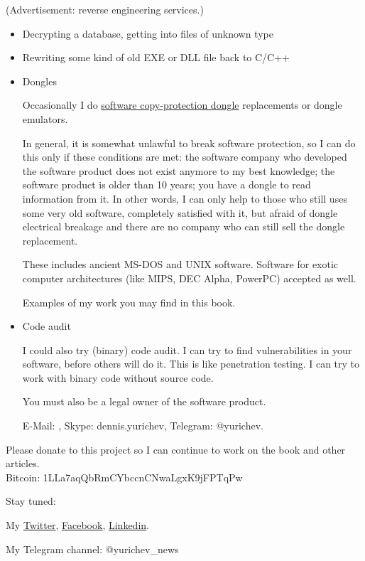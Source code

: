 
(Advertisement: reverse engineering services.)

\begin{itemize}
\item Decrypting a database, getting into files of unknown type

\item Rewriting some kind of old EXE or DLL file back to C/C++

\item Dongles

Occasionally I do \href{https://en.wikipedia.org/wiki/Software_protection_dongle}{software copy-protection dongle} replacements or dongle emulators.

In general, it is somewhat unlawful to break software protection, so I can do this only if these conditions are met:
the software company who developed the software product does not exist anymore to my best knowledge;
the software product is older than 10 years;
you have a dongle to read information from it. In other words, I can only help to those who still uses some very old software, completely satisfied with it, but afraid of dongle electrical breakage and there are no company who can still sell the dongle replacement.

These includes ancient MS-DOS and UNIX software. Software for exotic computer architectures (like MIPS, DEC Alpha, PowerPC) accepted as well.

Examples of my work you may find in this book.

\item Code audit

I could also try (binary) code audit.
I can try to find vulnerabilities in your software, before others will do it.
This is like penetration testing.
I can try to work with binary code without source code.

You must also be a legal owner of the software product.

E-Mail: \EMAIL, Skype: dennis.yurichev, Telegram: @yurichev.
\end{itemize}

\bigskip

Please donate to this project so I can continue to work on the book and other articles. \\
Bitcoin: 1LLa7aqQbRmCYbccnCNwaLgxK9jFPTqPw

\bigskip

Stay tuned:

My
\href{https://twitter.com/yurichev}{Twitter},
\href{https://www.facebook.com/dennis.yurichev.5}{Facebook},
\href{https://ua.linkedin.com/in/dennis-yurichev-5a8368132}{Linkedin}.

My Telegram channel: @yurichev\_news

